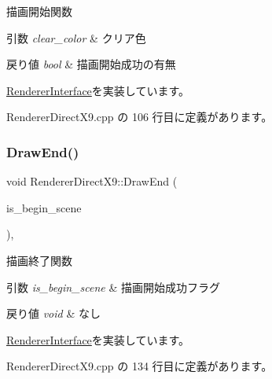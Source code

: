描画開始関数 


\begin{DoxyParams}{引数}
{\em clear\+\_\+color} & クリア色 \\
\hline
\end{DoxyParams}

\begin{DoxyRetVals}{戻り値}
{\em bool} & 描画開始成功の有無 \\
\hline
\end{DoxyRetVals}


\mbox{\hyperlink{class_renderer_interface_a8fad8e69ef40358a29e8dd75e4dbc7bd}{Renderer\+Interface}}を実装しています。



 Renderer\+Direct\+X9.\+cpp の 106 行目に定義があります。

\mbox{\label{class_renderer_direct_x9_a5f934597020f77dc9cf729acfb13a830}} 
\subsubsection{\texorpdfstring{Draw\+End()}{DrawEnd()}}
{\footnotesize\ttfamily void Renderer\+Direct\+X9\+::\+Draw\+End (\begin{DoxyParamCaption}\item[{bool}]{is\+\_\+begin\+\_\+scene }\end{DoxyParamCaption})\hspace{0.3cm}{\ttfamily [override]}, {\ttfamily [virtual]}}



描画終了関数 


\begin{DoxyParams}{引数}
{\em is\+\_\+begin\+\_\+scene} & 描画開始成功フラグ \\
\hline
\end{DoxyParams}

\begin{DoxyRetVals}{戻り値}
{\em void} & なし \\
\hline
\end{DoxyRetVals}


\mbox{\hyperlink{class_renderer_interface_a0034a44420e4746062e70e4d66d3bee2}{Renderer\+Interface}}を実装しています。



 Renderer\+Direct\+X9.\+cpp の 134 行目に定義があります。

